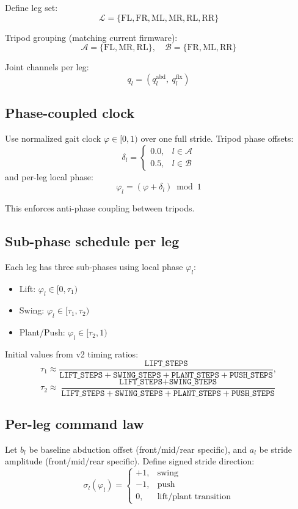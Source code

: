 \documentclass[11pt]{article}
\begin{document}
Define leg set:
\[
\mathcal{L}=\{\mathrm{FL},\mathrm{FR},\mathrm{ML},\mathrm{MR},\mathrm{RL},\mathrm{RR}\}
\]

Tripod grouping (matching current firmware):
\[
\mathcal{A}=\{\mathrm{FL},\mathrm{MR},\mathrm{RL}\},\quad
\mathcal{B}=\{\mathrm{FR},\mathrm{ML},\mathrm{RR}\}
\]

Joint channels per leg:
\[
q_l = (q^{\mathrm{abd}}_l,\ q^{\mathrm{flx}}_l)
\]

\subsection*{Phase-coupled clock}

Use normalized gait clock $\varphi\in[0,1)$ over one full stride.
Tripod phase offsets:
\[
\delta_l=
\begin{cases}
0.0, & l\in\mathcal{A}\\
0.5, & l\in\mathcal{B}
\end{cases}
\]
and per-leg local phase:
\[
\varphi_l = (\varphi + \delta_l)\bmod 1
\]

This enforces anti-phase coupling between tripods.

\subsection*{Sub-phase schedule per leg}

Each leg has three sub-phases using local phase $\varphi_l$:
\begin{itemize}
    \item Lift: $\varphi_l\in[0,\tau_1)$
    \item Swing: $\varphi_l\in[\tau_1,\tau_2)$
    \item Plant/Push: $\varphi_l\in[\tau_2,1)$
\end{itemize}

Initial values from v2 timing ratios:
\[
\tau_1 \approx \frac{\texttt{LIFT\_STEPS}}{\texttt{LIFT\_STEPS}+\texttt{SWING\_STEPS}+\texttt{PLANT\_STEPS}+\texttt{PUSH\_STEPS}},
\]
\[
\tau_2 \approx \frac{\texttt{LIFT\_STEPS}+\texttt{SWING\_STEPS}}{\texttt{LIFT\_STEPS}+\texttt{SWING\_STEPS}+\texttt{PLANT\_STEPS}+\texttt{PUSH\_STEPS}}
\]

\subsection*{Per-leg command law}

Let $b_l$ be baseline abduction offset (front/mid/rear specific), and $a_l$ be stride amplitude (front/mid/rear specific). Define signed stride direction:
\[
\sigma_l(\varphi_l)=
\begin{cases}
+1, & \text{swing}\\
-1, & \text{push}\\
0,  & \text{lift/plant transition}
\end{cases}
\]
\end{document}
